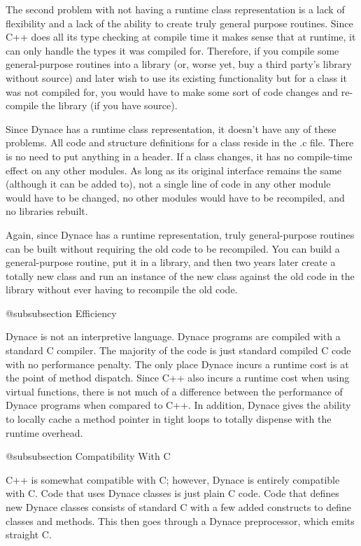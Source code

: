 The second problem with not having a runtime class representation is a
lack of flexibility and a lack of the ability to create truly general
purpose routines.  Since C++ does all its type checking at compile time
it makes sense that at runtime, it can only handle the types it was
compiled for.  Therefore, if you compile some general-purpose routines
into a library (or, worse yet, buy a third party's library without source)
and later wish to use its existing functionality but for a class it was
not compiled for, you would have to make some sort of code changes and
re-compile the library (if you have source).

Since Dynace has a runtime class representation, it doesn't have any of
these problems.  All code and structure definitions for a class reside
in the .c file.  There is no need to put anything in a header.  If a
class changes, it has no compile-time effect on any other modules.  As
long as its original interface remains the same (although it can be
added to), not a single line of code in any other module would have to
be changed, no other modules would have to be recompiled, and no
libraries rebuilt.

Again, since Dynace has a runtime representation, truly general-purpose
routines can be built without requiring the old code to be
recompiled.  You can build a general-purpose routine, put it in a
library, and then two years later create a totally new class and run
an instance of the new class against the old code in the library
without ever having to recompile the old code.

@subsubsection Efficiency

Dynace is not an interpretive language. Dynace programs are compiled with a
standard C compiler.  The majority of the code is just standard compiled
C code with no performance penalty.  The only place Dynace incurs a runtime
cost is at the point of method dispatch.  Since C++ also incurs a runtime
cost when using virtual functions, there is not much of a difference
between the performance of Dynace programs when compared to C++.  In addition,
Dynace gives the ability to locally cache a method pointer in tight loops
to totally dispense with the runtime overhead.


@subsubsection Compatibility With C

C++ is somewhat compatible with C; however, Dynace is entirely
compatible with C.  Code that uses Dynace classes is just plain C
code.  Code that defines new Dynace classes consists of standard C
with a few added constructs to define classes and methods.  This then
goes through a Dynace preprocessor, which emits straight C.

